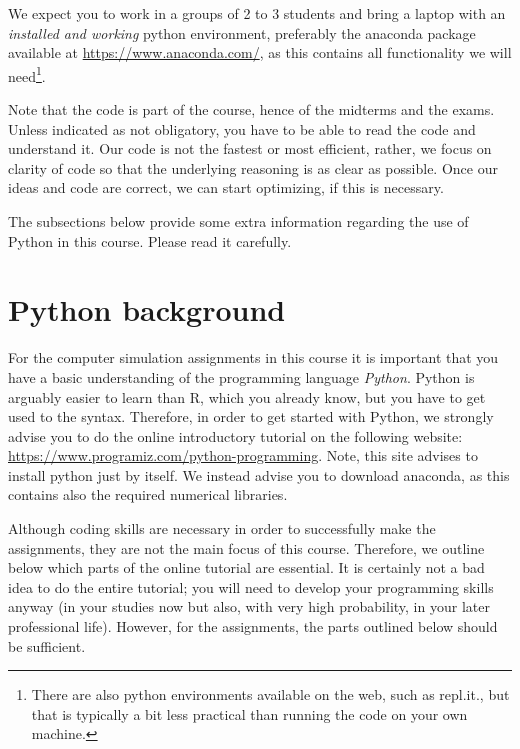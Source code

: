We expect you to work in a groups of 2 to 3 students and bring a laptop with an \emph{installed and working} python environment, preferably the anaconda package available at \url{https://www.anaconda.com/}, as this contains all functionality we will need\footnote{There are also python environments available on the web, such as repl.it., but that is typically a bit less practical than running the code on your own machine.}.

Note that the code is part of the course, hence of the midterms and the exams.
Unless indicated as not obligatory, you have to be able to read the code and understand it.
Our code is not the fastest or most efficient, rather, we focus on clarity of code so that the underlying reasoning is as clear as possible.
Once our ideas and code are correct, we can start optimizing, if this is necessary.



The subsections below provide some  extra information regarding the use of Python in this course. Please read it carefully.


\section*{Python background}


For the computer simulation assignments in this course it is important that you have a basic understanding of the programming language \emph{Python}.
Python is arguably easier to learn than R, which you already know, but you have to get used to the syntax.
Therefore, in order to get started with Python, we strongly advise you to do the online introductory tutorial on the following website: \url{https://www.programiz.com/python-programming}.
Note, this site advises to install python just by itself.
We instead advise you to download anaconda, as this contains also the required numerical libraries.

Although coding skills are necessary in order to successfully make the assignments, they are not the main focus of this course.
Therefore, we outline below which parts of the online tutorial are essential.
It is certainly not a bad idea to do the entire tutorial; you will need to develop your programming skills anyway (in your studies now but also, with very high probability, in your later professional life).
However, for the assignments, the parts outlined below should be sufficient.

